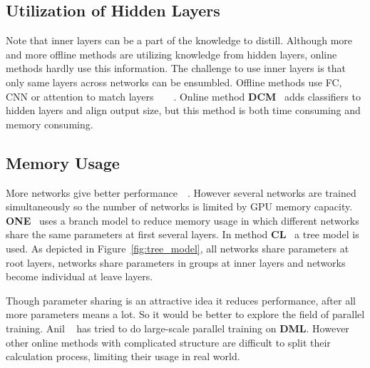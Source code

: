 \documentclass[10pt,twocolumn,letterpaper]{article}
\begin{document}
\subsection{Utilization of Hidden Layers} Note that inner layers can be a part of the knowledge to distill.
Although more and more offline methods are utilizing knowledge from hidden layers, online methods hardly use this information.
The challenge to use inner layers is that
only same layers across networks can be ensumbled.
Offline methods use FC, CNN or attention to match layers~\cite{chen2021cross}~\cite{romero2014fitnets}~\cite{yao2020knowledge}~\cite{DBLP:journals/corr/ZagoruykoK16a}.
Online method \textbf{DCM}~\cite{yao2020knowledge} adds classifiers to hidden layers and align output size,
but this method is both time consuming and memory consuming.

\subsection{Memory Usage}
More networks give better performance~\cite{du2020agree}~\cite{wu2021peer}.
However several networks are trained
simultaneously so the number of networks is
limited by GPU memory capacity. \textbf{ONE}~\cite{lan2018knowledge}
uses a branch model to reduce memory usage in which different networks
share the same parameters at first several layers.
In method \textbf{CL}~\cite{song2018collaborative} a tree model is used. As
depicted in Figure~\ref{fig:tree_model}, all networks share parameters at root layers,
networks share parameters in groups at inner layers and networks become individual at leave layers.

Though parameter sharing is an attractive idea it reduces performance,
after all more parameters means a lot. So it would be better to explore
the field of parallel training. Anil \etal~\cite{anil2018large} has tried to
do large-scale parallel training on \textbf{DML}\cite{zhang2018deep}.
However other online methods with complicated structure are difficult to
split their calculation process, limiting their usage in real world.
\end{document}
